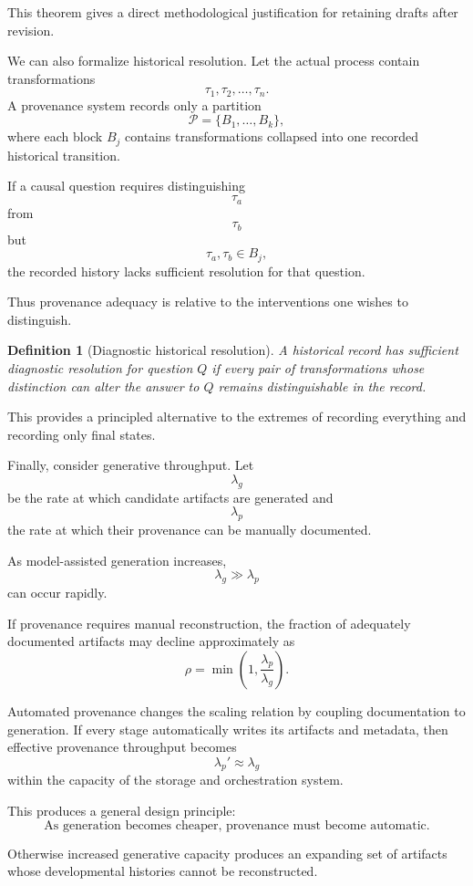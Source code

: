 \documentclass[11pt]{article}
\newtheorem{definition}{Definition}[section]
\begin{document}
This theorem gives a direct methodological justification for retaining drafts after revision.

We can also formalize historical resolution. Let the actual process contain transformations
\[
    \tau_1,\tau_2,\ldots,\tau_n.
\]
A provenance system records only a partition
\[
    \mathcal{P}
    =
    \{B_1,\ldots,B_k\},
\]
where each block \(B_j\) contains transformations collapsed into one recorded historical transition.

If a causal question requires distinguishing
\[
    \tau_a
\]
from
\[
    \tau_b
\]
but
\[
    \tau_a,\tau_b\in B_j,
\]
the recorded history lacks sufficient resolution for that question.

Thus provenance adequacy is relative to the interventions one wishes to distinguish.

\begin{definition}[Diagnostic historical resolution]
A historical record has sufficient diagnostic resolution for question \(Q\) if every pair of transformations whose distinction can alter the answer to \(Q\) remains distinguishable in the record.
\end{definition}

This provides a principled alternative to the extremes of recording everything and recording only final states.

Finally, consider generative throughput. Let
\[
    \lambda_g
\]
be the rate at which candidate artifacts are generated and
\[
    \lambda_p
\]
the rate at which their provenance can be manually documented.

As model-assisted generation increases,
\[
    \lambda_g\gg\lambda_p
\]
can occur rapidly.

If provenance requires manual reconstruction, the fraction of adequately documented artifacts may decline approximately as
\[
    \rho
    =
    \min
    \left(
        1,
        \frac{\lambda_p}{\lambda_g}
    \right).
\]

Automated provenance changes the scaling relation by coupling documentation to generation. If every stage automatically writes its artifacts and metadata, then effective provenance throughput becomes
\[
    \lambda_p'
    \approx
    \lambda_g
\]
within the capacity of the storage and orchestration system.

This produces a general design principle:
\[
    \boxed{
    \text{As generation becomes cheaper, provenance must become automatic.}
    }
\]

Otherwise increased generative capacity produces an expanding set of artifacts whose developmental histories cannot be reconstructed.
\end{document}
